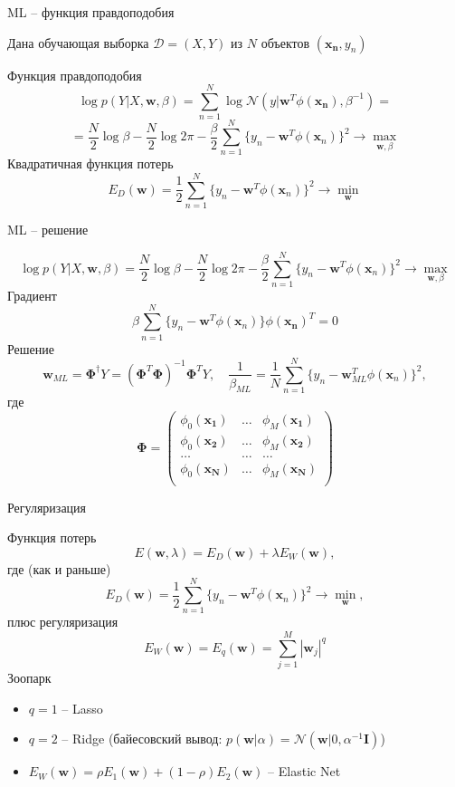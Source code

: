 \documentclass[10pt]{beamer}
\begin{document}
\begin{frame}{ML -- функция правдоподобия}

Дана обучающая выборка $\mathcal{D} = (X, Y)$ из $N$ объектов $(\mathbf{x_n}, y_n)$

\vspace{1em}
Функция правдоподобия
\[
\log p(Y | X, \mathbf{w}, \beta) = \sum_{n=1}^N \log \mathcal{N}(y | \mathbf{w}^T \phi(\mathbf{x_n}), \beta^{-1}) = 
\]
\[
= \frac{N}{2} \log \beta - \frac{N}{2} \log 2 \pi - \frac{\beta}{2} \sum_{n=1}^N \{y_n - \mathbf{w}^T \phi(\mathbf{x}_n)\}^2 \rightarrow \max_{\mathbf{w}, \beta}
\]
Квадратичная функция потерь
\[
E_D(\mathbf{w}) = \frac 1 2 \sum_{n=1}^N \{y_n - \mathbf{w}^T \phi(\mathbf{x}_n)\}^2 \rightarrow \min_{\mathbf{w}}
\]

\end{frame}

\begin{frame}{ML -- решение}

\[
\log p(Y | X, \mathbf{w}, \beta)
= \frac{N}{2} \log \beta - \frac{N}{2} \log 2 \pi - \frac{\beta}{2} \sum_{n=1}^N \{y_n - \mathbf{w}^T \phi(\mathbf{x}_n)\}^2 \rightarrow \max_{\mathbf{w}, \beta}
\]
Градиент
\[
\beta \sum_{n=1}^N \{y_n - \mathbf{w}^T \phi(\mathbf{x}_n)\} \phi(\mathbf{x_n})^T = 0
\]
Решение
 \[
 \mathbf{w}_{ML} = \mathbf{\Phi}^{\dagger} Y = (\mathbf{\Phi}^T \mathbf{\Phi})^{-1} \mathbf{\Phi}^T Y, \quad
 \frac{1}{\beta_{ML}} = \frac{1}{N} \sum_{n=1}^N \{y_n - \mathbf{w}_{ML}^T \phi(\mathbf{x}_n)\}^2, 
 \]
 где
 \[
 \mathbf{\Phi} = \begin{pmatrix}
 \phi_0(\mathbf{x_1}) & \ldots &  \phi_M(\mathbf{x_1}) \\
 \phi_0(\mathbf{x_2}) & \ldots &  \phi_M(\mathbf{x_2}) \\
 \ldots & \ldots & \ldots \\
  \phi_0(\mathbf{x_N}) & \ldots &  \phi_M(\mathbf{x_N}) \\
 \end{pmatrix}
 \]

\end{frame}

\begin{frame}{Регуляризация}

Функция потерь
\[
E(\mathbf{w}, \lambda) = E_D(\mathbf{w}) + \lambda E_W(\mathbf{w}),
\]
где (как и раньше)
\[
E_D(\mathbf{w}) = \frac 1 2 \sum_{n=1}^N \{y_n - \mathbf{w}^T \phi(\mathbf{x}_n)\}^2 \rightarrow \min_{\mathbf{w}},
\]
плюс регуляризация
\[
E_W(\mathbf{w}) = E_q(\mathbf{w}) = \sum_{j=1}^M |\mathbf{w}_j|^q
\]
Зоопарк
\begin{itemize}
\item $q = 1$ -- Lasso
\item $q = 2$ -- Ridge (байесовский вывод: $p(\mathbf{w} | \alpha) = \mathcal{N}(\mathbf{w} | 0, \alpha^{-1} \mathbf{I})$)
\item $E_W(\mathbf{w}) = \rho E_1(\mathbf{w}) + (1 - \rho) E_2(\mathbf{w})$ -- Elastic Net
\end{itemize}

\end{frame}
\end{document}
